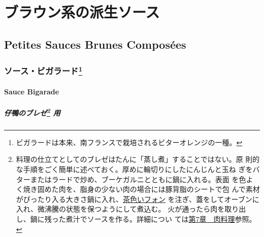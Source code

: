 \hypertarget{ux30d6ux30e9ux30a6ux30f3ux7cfbux306eux6d3eux751fux30bdux30fcux30b9}{%
\section{ブラウン系の派生ソース}\label{ux30d6ux30e9ux30a6ux30f3ux7cfbux306eux6d3eux751fux30bdux30fcux30b9}}

\hypertarget{petites-sauces-brunes-composuxe9es}{%
\subsection{Petites Sauces Brunes
Composées}\label{petites-sauces-brunes-composuxe9es}}

\begin{recette}
\hypertarget{ux30bdux30fcux30b9ux30d3ux30acux30e9ux30fcux30c91}{%
\subsubsection[ソース・ビガラード]{\texorpdfstring{ソース・ビガラード\footnote{ビガラードは本来、南フランスで栽培されるビターオレンジの一種。}}{ソース・ビガラード}}\label{ux30bdux30fcux30b9ux30d3ux30acux30e9ux30fcux30c91}}

\hypertarget{sauce-bigarade}{%
\paragraph{Sauce Bigarade}\label{sauce-bigarade}}


\hypertarget{ux4ed4ux9d28ux306eux30d6ux30ecux30bc2-ux7528}{%
\subparagraph[仔鴨のブレゼ 用]{\texorpdfstring{仔鴨のブレゼ\footnote{料理の仕立てとしてのブレゼはたんに「蒸し煮」することではない。原
  則的な手順をごく簡単に述べておく。厚めに輪切りにしたにんじんと玉ね
  ぎをバターまたはラードで炒め、ブーケガルニとともに鍋に入れる。表面
  を色よく焼き固めた肉を、脂身の少ない肉の場合には豚背脂のシートで包
  んで素材がぴったり入る大きさ鍋に入れ、\protect\hyperlink{fonds-brun}{茶色いフォン}
  を注ぎ、蓋をしてオーブンに入れ、微沸騰の状態を保つようにして煮込む。
  火が通ったら肉を取り出し、鍋に残った煮汁でソースを作る。詳細につい
  ては\protect\hyperlink{}{第7章　肉料理}参照。}
用}{仔鴨のブレゼ 用}}\label{ux4ed4ux9d28ux306eux30d6ux30ecux30bc2-ux7528}}


\end{recette}
